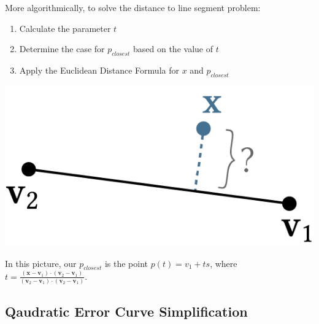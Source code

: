 More algorithmically, to solve the distance to line segment problem:
\begin{enumerate}
    \item Calculate the parameter $t$
    \item Determine the case for $p_{closest}$ based on the value of $t$
    \item Apply the Euclidean Distance Formula for $x$ and $p_{closest}$
\end{enumerate}

\begin{marginfigure}
   \centering
   \includegraphics[width=0.8\linewidth]{images/SegmentDistance.png}
   \caption{In this picture, our $p_{closest}$ is the point $p(t) = v_1 + ts$, where $t=\frac{(\mathbf{x}-\mathbf{v}_{1})\cdot (\mathbf{v}_{2}-\mathbf{v}_{1})}{(\mathbf{v}_{2}-\mathbf{v}_{1})\cdot (\mathbf{v}_{2}-\mathbf{v}_{1})}$.}  
\end{marginfigure}

\subsection{Qaudratic Error Curve Simplification}

